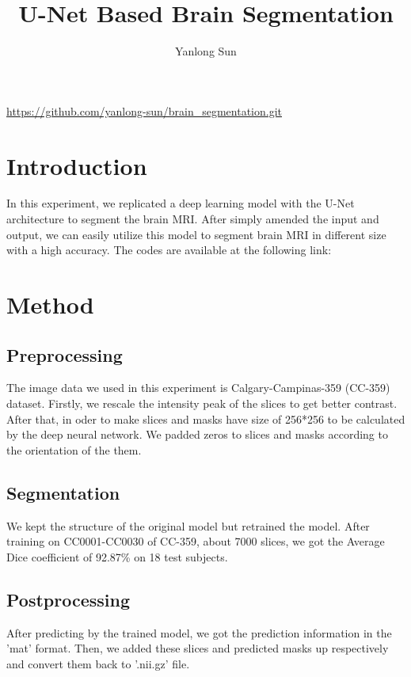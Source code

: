 \documentclass[12pt]{article}
\date{}
\title{U-Net Based Brain Segmentation}
\author{Yanlong Sun}
\begin{document}
\maketitle
 \urldef{\myurl}\url{https://github.com/yanlong-sun/brain_segmentation.git}
\thispagestyle{empty}

\section{Introduction}
In this experiment, we replicated a deep learning model with the U-Net architecture \cite{buda} to segment the brain MRI. After simply amended the input and output, we can easily utilize this model to segment brain MRI in different size with a high accuracy. The codes are available at the following link: \myurl
\section{Method}

\subsection{Preprocessing}
The image data we used in this experiment is Calgary-Campinas-359 \cite{dataset}(CC-359) dataset. Firstly, we rescale the intensity peak of the slices to get better contrast. After that, in oder to make slices and masks have size of 256*256 to be calculated by the deep neural network. We padded zeros to slices and masks according to the orientation of the them.  

\subsection{Segmentation}
We kept the structure of the original model but retrained the model. After training on CC0001-CC0030 of CC-359, about 7000 slices, we got the Average Dice coefficient of 92.87\% on 18 test subjects.

\subsection{Postprocessing}
After predicting by the trained model, we got the prediction information in the 'mat' format. Then, we added these slices and predicted masks up respectively and convert them back to '.nii.gz' file.







\end{document}
